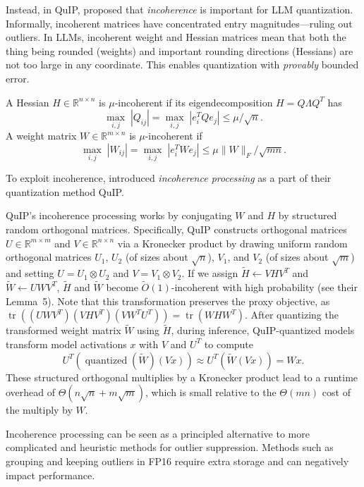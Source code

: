 Instead, in QuIP, \citet{chee2023quip} proposed that \emph{incoherence} is important for LLM quantization. Informally, incoherent matrices have concentrated entry magnitudes---ruling out outliers. In LLMs, incoherent weight and Hessian matrices mean that both the thing being rounded (weights) and important rounding directions (Hessians) are not too large in any coordinate. This enables quantization with \emph{provably} bounded error.

\begin{definition}
A Hessian $H \in \mathbb{R}^{n \times n}$ is $\mu$-incoherent if its eigendecomposition $H = Q \Lambda Q^T$ has \[\textstyle \max_{i,j} \; |Q_{ij}| = \max_{i,j} \; |e_i^T Q e_j| \leq \mu / \sqrt{n}.\] 
A weight matrix $W \in \mathbb{R}^{m \times n}$ is $\mu$-incoherent if \[\max_{i,j} \; \textstyle |W_{ij}| = \max_{i,j} \; |e_i^T W e_j| \leq \mu \|W\|_F / \sqrt{mn}.\]
\end{definition}

To exploit incoherence, \citet{chee2023quip} introduced \emph{incoherence processing} as a part of their quantization method QuIP.

QuIP's incoherence processing works by conjugating $W$ and $H$ by structured random orthogonal matrices. Specifically, QuIP constructs orthogonal matrices $U \in \mathbb{R}^{m \times m}$ and $V \in \mathbb{R}^{n \times n}$ via a Kronecker product by drawing uniform random orthogonal matrices $U_1$, $U_2$ (of sizes about $\sqrt{n}$), $V_1$, and $V_2$ (of sizes about $\sqrt{m}$) and setting $U = U_1 \otimes U_2$ and $V = V_1 \otimes V_2$. If we assign $\tilde H \gets V H V^T$ and $\tilde W \gets U W V^T$, $\tilde H$ and $\tilde W$ become $\tilde{O}(1)$-incoherent with high probability (see their Lemma~5). Note that this transformation preserves the proxy objective, as $\operatorname{tr}\left((U W V^T) (V H V^T) (V W^T U^T)\right) = \operatorname{tr}\left(WHW^T\right)$.
After quantizing the transformed weight matrix $\tilde W$ using $\tilde H$, during inference, QuIP-quantized models transform model activations $x$ with $V$ and $U^T$ to compute \[
\textstyle U^T (\operatorname{quantized}(\tilde W) (V x)) \approx U^T (\tilde W (V x)) = Wx. \]
These structured orthogonal multiplies by a Kronecker product lead to a runtime overhead of $\Theta(n \sqrt{n} + m \sqrt{m})$, which is small relative to the $\Theta(mn)$ cost of the multiply by $W$.

Incoherence processing can be seen as a principled alternative to more complicated and heuristic methods for outlier suppression. Methods such as grouping and keeping outliers in FP16 require extra storage and can negatively impact performance.

